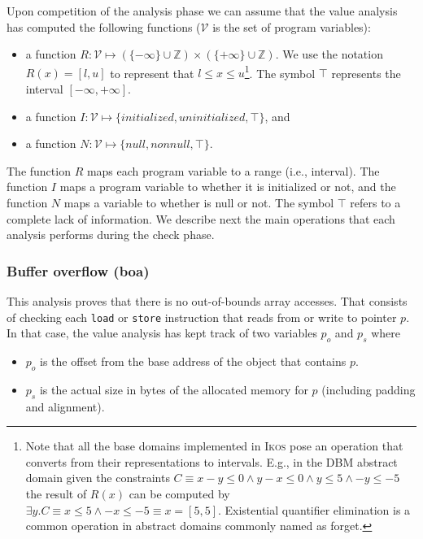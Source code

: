\documentclass[a4]{article}
\newcommand{\ikos}{\textsc{Ikos}\xspace}
\begin{document}
Upon competition of the analysis phase we can assume that the value
analysis has computed the following functions ($\mathcal{V}$ is
the set of program variables):

\begin{itemize}

\item a function $R: \mathcal{V} \mapsto (\{-\infty \} \cup
  {\mathbb{Z}}) \times (\{+\infty \} \cup {\mathbb{Z}})$.
%
We use the notation $R(x) = [l,u]$ to represent that $l \leq x \leq
u$\footnote{Note that all the base domains implemented in \ikos pose
  an operation that converts from their representations to
  intervals. E.g., in the DBM abstract domain given the constraints $C
  \equiv x - y \leq 0 \wedge y -x \leq 0 \wedge y \leq 5 \wedge -y
  \leq -5$ the result of $R(x)$ can be computed by $\exists y. C
  \equiv x\leq 5 \wedge -x \leq -5 \equiv x = [5,5]$. Existential
  quantifier elimination is a common operation in abstract domains
  commonly named as \textsf{forget}.}. The symbol $\top$ represents
the interval $[-\infty, +\infty]$.

\item a function $I: \mathcal{V} \mapsto \{initialized, uninitialized,
  \top\}$, and

\item a function $N: \mathcal{V} \mapsto \{null, nonnull, \top\}$. 

\end{itemize}

\noindent The function $R$ maps each program variable to a range
(i.e., interval).  The function $I$ maps a program variable to whether
it is initialized or not, and the function $N$ maps a variable to
whether is null or not. The symbol $\top$ refers to a complete lack of
information. We describe next the main operations that each analysis
performs during the check phase.

\subsubsection{Buffer overflow (\textsf{boa})}

This analysis proves that there is no out-of-bounds array
accesses. That consists of checking each \texttt{load} or
\texttt{store} instruction that reads from or write to pointer $p$. In
that case, the value analysis has kept track of two variables $p_{o}$
and $p_{s}$ where

  \begin{itemize}
    
  \item $p_{o}$ is the offset from the base address of the object that
    contains $p$.
    
  \item $p_{s}$ is the actual size in bytes of the allocated memory
    for $p$ (including padding and alignment).
    
  \end{itemize}
\end{document}
